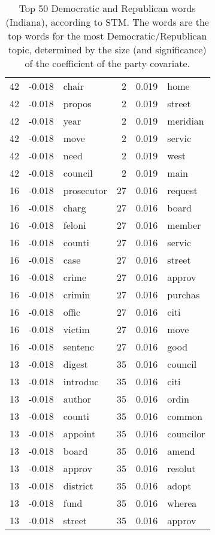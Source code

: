\begin{table}[ht]
\begin{tabular}{rrlrrl}
    42 & -0.018 & chair &    2 & 0.019 & home \\ 
    42 & -0.018 & propos &    2 & 0.019 & street \\ 
    42 & -0.018 & year &    2 & 0.019 & meridian \\ 
    42 & -0.018 & move &    2 & 0.019 & servic \\ 
    42 & -0.018 & need &    2 & 0.019 & west \\ 
    42 & -0.018 & council &    2 & 0.019 & main \\ 
    16 & -0.018 & prosecutor &   27 & 0.016 & request \\ 
    16 & -0.018 & charg &   27 & 0.016 & board \\ 
    16 & -0.018 & feloni &   27 & 0.016 & member \\ 
    16 & -0.018 & counti &   27 & 0.016 & servic \\ 
    16 & -0.018 & case &   27 & 0.016 & street \\ 
    16 & -0.018 & crime &   27 & 0.016 & approv \\ 
    16 & -0.018 & crimin &   27 & 0.016 & purchas \\ 
    16 & -0.018 & offic &   27 & 0.016 & citi \\ 
    16 & -0.018 & victim &   27 & 0.016 & move \\ 
    16 & -0.018 & sentenc &   27 & 0.016 & good \\ 
    13 & -0.018 & digest &   35 & 0.016 & council \\ 
    13 & -0.018 & introduc &   35 & 0.016 & citi \\ 
    13 & -0.018 & author &   35 & 0.016 & ordin \\ 
    13 & -0.018 & counti &   35 & 0.016 & common \\ 
    13 & -0.018 & appoint &   35 & 0.016 & councilor \\ 
    13 & -0.018 & board &   35 & 0.016 & amend \\ 
    13 & -0.018 & approv &   35 & 0.016 & resolut \\ 
    13 & -0.018 & district &   35 & 0.016 & adopt \\ 
    13 & -0.018 & fund &   35 & 0.016 & wherea \\ 
    13 & -0.018 & street &   35 & 0.016 & approv \\ 
   \hline
\end{tabular}
\endgroup
\caption{Top 50 Democratic and Republican words (Indiana), according to STM. 
             The words are the top words for the most Democratic/Republican topic, determined
             by the size (and significance) of the coefficient of the party covariate.} 
\label{tabSTMIN}
\end{table}

